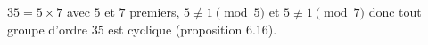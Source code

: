 $35 = 5\times 7$ avec $5$ et $7$ premiers, $5\not\equiv 1\pmod{5}$ et 
$5\not\equiv 1\pmod{7}$ donc tout groupe d'ordre $35$ est cyclique
(proposition 6.16).
